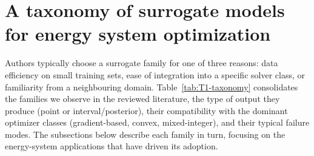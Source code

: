 \section{A taxonomy of surrogate models for energy system optimization}
\label{sec:taxonomy}

Authors typically choose a surrogate family for one of three reasons:
data efficiency on small training sets, ease of integration into a
specific solver class, or familiarity from a neighbouring domain.
Table~\ref{tab:T1-taxonomy} consolidates the families we observe in
the reviewed literature, the type of output they produce (point or
interval/posterior), their compatibility with the dominant optimizer
classes (gradient-based, convex, mixed-integer), and their typical
failure modes. The subsections below describe each family in turn,
focusing on the energy-system applications that have driven its
adoption.

